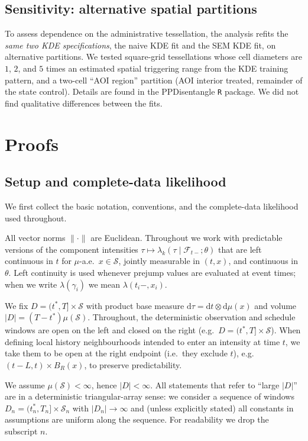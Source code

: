 \documentclass{statsoc}
\newcommand{\dd}{\mathrm{d}}
\newcommand{\1}{\mathbbm{1}}
\begin{document}
\subsection{Sensitivity: alternative spatial partitions}\label{sec:ok_partition_sens}
To assess dependence on the administrative tessellation, the analysis refits the \emph{same two KDE specifications}, the naive KDE fit and the SEM KDE fit, on alternative partitions. We tested square-grid tessellations whose cell diameters are $1$, $2$, and $5$ times an estimated spatial triggering range from the KDE training pattern, and a two-cell ``AOI region'' partition (AOI interior treated, remainder of the state control). Details are found in the PPDisentangle \cite{PPDisentangle} \texttt{R} package. We did not find qualitative differences between the fits.



\section{Proofs}
\subsection{Setup and complete-data likelihood}\label{sec:setup}

We first collect the basic notation, conventions, and the complete-data likelihood used throughout.

All vector norms $\|\cdot\|$ are Euclidean. Throughout we work with predictable versions of the component intensities $\tau\mapsto \lambda_k(\tau\mid \mathcal F_{t-};\theta)$ that are left continuous in $t$ for $\mu$-a.e.\ $x\in\mathcal S$, jointly measurable in $(t,x)$, and continuous in $\theta$. Left continuity is used whenever pre\-jump values are evaluated at event times; when we write $\lambda(\gamma_i)$ we mean $\lambda(t_i-,x_i)$.

We fix $D=(t^\ast,T]\times\mathcal S$ with product base measure $\dd\tau=\dd t\otimes\dd\mu(x)$ and volume
$|D|=(T-t^\ast) \mu(\mathcal S)$.  Throughout, the deterministic observation and schedule windows are open on the left and closed on the right (e.g.\ $D=(t^\ast,T]\times\mathcal S$). When defining local history neighbourhoods intended to enter an intensity at time \(t\), we take them to be open at the right endpoint (i.e.\ they exclude \(t\)), e.g.\ \((t-L,t)\times B_R(x)\), to preserve predictability.

We assume $\mu(\mathcal S)<\infty$, hence $|D|<\infty$.  All statements that refer to ``large $|D|$'' are in a deterministic triangular-array sense: we consider a sequence of windows $D_n=(t^\ast_n,T_n]\times\mathcal S_n$ with $|D_n|\to\infty$ and (unless explicitly stated) all constants in assumptions are uniform along the sequence. For readability we drop the subscript $n$. 
\end{document}
